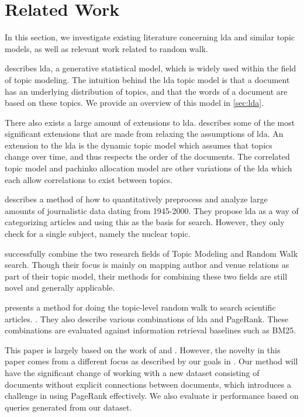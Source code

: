 \section{Related Work}\label{sec:related-works} 
In this section, we investigate existing literature concerning \gls{lda} and similar topic models, as well as relevant work related to random walk.

\citet{lda} describes \acrlong{lda}, a generative statistical model, which is widely used within the field of topic modeling. 
The intuition behind the \gls{lda} topic model is that a document has an underlying distribution of topics, and that the words of a document are based on these topics.
We provide an overview of this model in \autoref{sec:lda}.

There also exists a large amount of extensions to \gls{lda}.
\citet{blei2012topicmodels} describes some of the most significant extensions that are made from relaxing the assumptions of \gls{lda}.
An extension to the \gls{lda} is the dynamic topic model\cite{blei2006dynamic} which assumes that topics change over time, and thus respects the order of the documents. 
The correlated topic model\cite{blei2007correlated} and pachinko allocation model\cite{li2006pachinko} are other variations of the \gls{lda} which each allow correlations to exist between topics.


\citet{quanti} describes a method of how to quantitatively preprocess and analyze large amounts of journalistic data dating from 1945-2000. 
They propose \gls{lda} as a way of categorizing articles and using this as the basis for search.
However, they only check for a single subject, namely the nuclear topic.  


\citet{Tang2008} successfully combine the two research fields of Topic Modeling and Random Walk search. 
Though their focus is mainly on mapping author and venue relations as part of their topic model, their methods for combining these two fields are still novel and generally applicable.


\citet{yang2009topic} presents a method for doing the topic-level random walk to search scientific articles.
.
They also describe various combinations of \gls{lda} and PageRank.
These combinations are evaluated against information retrieval baselines such as BM25\cite{bm251996}.


This paper is largely based on the work of \citeauthor{yang2009topic}\cite{yang2009topic} and \citeauthor{Tang2008}\cite{Tang2008}.
However, the novelty in this paper comes from a different focus as described by our goals in .
Our method will have the significant change of working with a new dataset consisting of documents without explicit connections between documents, which introduces a challenge in using PageRank effectively.
We also evaluate \gls{ir} performance based on queries generated from our dataset.

